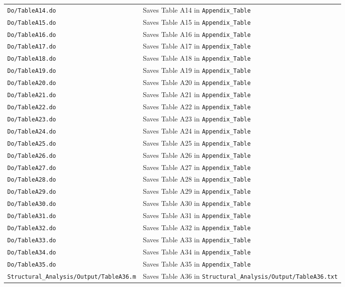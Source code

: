 \documentclass[12pt,notitlepage]{article}
\begin{document}
\begin{table}
{\begin{tabular}{ll}
\texttt{Do/TableA14.do}   & Saves Table A14 in \texttt{Appendix\_Table}\\
\texttt{Do/TableA15.do}   & Saves Table A15 in \texttt{Appendix\_Table}\\
\texttt{Do/TableA16.do}   & Saves Table A16 in \texttt{Appendix\_Table}\\
\texttt{Do/TableA17.do}   & Saves Table A17 in \texttt{Appendix\_Table}\\
\texttt{Do/TableA18.do}   & Saves Table A18 in \texttt{Appendix\_Table}\\
\texttt{Do/TableA19.do}   & Saves Table A19 in \texttt{Appendix\_Table}\\
\texttt{Do/TableA20.do}   & Saves Table A20 in \texttt{Appendix\_Table}\\
\texttt{Do/TableA21.do}   & Saves Table A21 in \texttt{Appendix\_Table}\\
\texttt{Do/TableA22.do}   & Saves Table A22 in \texttt{Appendix\_Table}\\
\texttt{Do/TableA23.do}   & Saves Table A23 in \texttt{Appendix\_Table}\\
\texttt{Do/TableA24.do}   & Saves Table A24 in \texttt{Appendix\_Table}\\
\texttt{Do/TableA25.do}   & Saves Table A25 in \texttt{Appendix\_Table}\\
\texttt{Do/TableA26.do}   & Saves Table A26 in \texttt{Appendix\_Table}\\
\texttt{Do/TableA27.do}   & Saves Table A27 in \texttt{Appendix\_Table}\\
\texttt{Do/TableA28.do}   & Saves Table A28 in \texttt{Appendix\_Table}\\
\texttt{Do/TableA29.do}   & Saves Table A29 in \texttt{Appendix\_Table}\\
\texttt{Do/TableA30.do}   & Saves Table A30 in \texttt{Appendix\_Table}\\
\texttt{Do/TableA31.do}   & Saves Table A31 in \texttt{Appendix\_Table}\\
\texttt{Do/TableA32.do}   & Saves Table A32 in \texttt{Appendix\_Table}\\
\texttt{Do/TableA33.do}   & Saves Table A33 in \texttt{Appendix\_Table}\\
\texttt{Do/TableA34.do}   & Saves Table A34 in \texttt{Appendix\_Table}\\
\texttt{Do/TableA35.do}   & Saves Table A35 in \texttt{Appendix\_Table}\\
\texttt{Structural\_Analysis/Output/TableA36.m} & Saves Table A36 in \texttt{Structural\_Analysis/Output/TableA36.txt}\\

\end{tabular}}
\end{table}
\end{document}

